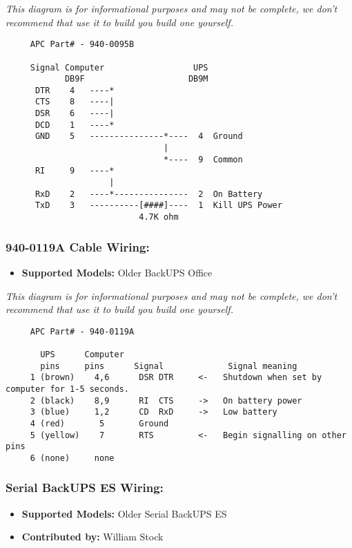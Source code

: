 \emph{This diagram is for informational purposes and may not be complete, we don't
recommend that use it to build you build one yourself.}
\footnotesize
\begin{verbatim}
     APC Part# - 940-0095B
     
     Signal Computer                  UPS
            DB9F                     DB9M
      DTR    4   ----*
      CTS    8   ----|
      DSR    6   ----|
      DCD    1   ----*
      GND    5   ---------------*----  4  Ground
                                |
                                *----  9  Common
      RI     9   ----*
                     |
      RxD    2   ----*---------------  2  On Battery
      TxD    3   ----------[####]----  1  Kill UPS Power
                           4.7K ohm
\end{verbatim}
\normalsize

\subsubsection*{940-0119A Cable Wiring:}

\begin{itemize}
\item {\bf Supported Models:} Older BackUPS Office
\end{itemize}

\emph{This diagram is for informational purposes and may not be complete, we don't
recommend that use it to build you build one yourself.}
\footnotesize
\begin{verbatim}
     APC Part# - 940-0119A
     
       UPS      Computer
       pins     pins      Signal             Signal meaning
     1 (brown)    4,6      DSR DTR     <-   Shutdown when set by computer for 1-5 seconds.
     2 (black)    8,9      RI  CTS     ->   On battery power
     3 (blue)     1,2      CD  RxD     ->   Low battery
     4 (red)       5       Ground
     5 (yellow)    7       RTS         <-   Begin signalling on other pins
     6 (none)     none
\end{verbatim}
\normalsize

\subsubsection*{Serial BackUPS ES Wiring:}

\begin{itemize}
\item {\bf Supported Models:} Older Serial BackUPS ES
\item {\bf Contributed by:} William Stock
\end{itemize}


